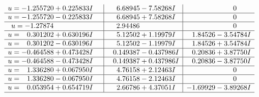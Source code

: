 \documentclass[1p]{elsarticle_modified}
\theoremstyle{definition}
\begin{document}
$$\begin{array}{c|c|c}
\begin{aligned}
u &= -1.255720 + 0.225833 I\end{aligned}
 & \phantom{-}6.68945 - 7.58268 I & \phantom{-0.000000 } 0 \\ \hline\begin{aligned}
u &= -1.255720 - 0.225833 I\end{aligned}
 & \phantom{-}6.68945 + 7.58268 I & \phantom{-0.000000 } 0 \\ \hline\begin{aligned}
u &= -1.27874\phantom{ +0.000000I}\end{aligned}
 & \phantom{-}2.94486\phantom{ +0.000000I} & \phantom{-0.000000 } 0 \\ \hline\begin{aligned}
u &= \phantom{-}0.301202 + 0.630196 I\end{aligned}
 & \phantom{-}5.12502 + 1.19979 I & \phantom{-}1.84526 - 3.54784 I \\ \hline\begin{aligned}
u &= \phantom{-}0.301202 - 0.630196 I\end{aligned}
 & \phantom{-}5.12502 - 1.19979 I & \phantom{-}1.84526 + 3.54784 I \\ \hline\begin{aligned}
u &= -0.464588 + 0.473428 I\end{aligned}
 & \phantom{-}0.149387 - 0.437986 I & \phantom{-}0.20836 + 3.87750 I \\ \hline\begin{aligned}
u &= -0.464588 - 0.473428 I\end{aligned}
 & \phantom{-}0.149387 + 0.437986 I & \phantom{-}0.20836 - 3.87750 I \\ \hline\begin{aligned}
u &= \phantom{-}1.336280 + 0.067950 I\end{aligned}
 & \phantom{-}4.76158 + 2.12463 I & \phantom{-0.000000 } 0 \\ \hline\begin{aligned}
u &= \phantom{-}1.336280 - 0.067950 I\end{aligned}
 & \phantom{-}4.76158 - 2.12463 I & \phantom{-0.000000 } 0 \\ \hline\begin{aligned}
u &= \phantom{-}0.053954 + 0.654719 I\end{aligned}
 & \phantom{-}2.66786 + 4.37051 I & -1.69929 - 3.89268 I\\
 \hline 
 \end{array}$$\newpage$$\begin{array}{c|c|c}  

\end{array}$$
\end{document}
